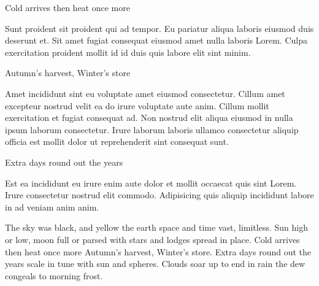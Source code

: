 {\mktsHTwo{}\cjkgGlue{} Cold arrives then heat once more\mktsHTwoBEG}%


\vspace{\myLineheight}\begin{multicols}{2}\raggedcolumns{}Sunt proident sit proident qui ad tempor. Eu pariatur aliqua laboris eiusmod duis deserunt et. Sit amet fugiat consequat eiusmod amet nulla laboris Lorem. Culpa exercitation proident mollit id id duis quis labore elit sint minim.



\end{multicols}


{\mktsHOne{}\cjkgGlue{} Autumn’s harvest, Winter’s store\mktsHOneBEG}%


\vspace{\myLineheight}\begin{multicols}{2}\raggedcolumns{}Amet incididunt sint eu voluptate amet eiusmod consectetur. Cillum amet excepteur nostrud velit ea do irure voluptate aute anim. Cillum mollit exercitation et fugiat consequat ad. Non nostrud elit aliqua eiusmod in nulla ipsum laborum consectetur. Irure laborum laboris ullamco consectetur aliquip officia est mollit dolor ut reprehenderit sint consequat sunt.



\end{multicols}


{\mktsHTwo{}\cjkgGlue{} Extra days round out the years\mktsHTwoBEG}%


\vspace{\myLineheight}\begin{multicols}{2}\raggedcolumns{}Est ea incididunt eu irure enim aute dolor et mollit occaecat quis sint Lorem. Irure consectetur nostrud elit commodo. Adipisicing quis aliquip incididunt labore in ad veniam anim anim.



\cjkgGlue{} The sky was black, and yellow the earth
\cjkgGlue{} space and time vast, limitless.
\cjkgGlue{} Sun high or low, moon full or parsed
\cjkgGlue{} with stars and lodges spread in place.
\cjkgGlue{} Cold arrives then heat once more
\cjkgGlue{} Autumn’s harvest, Winter’s store.
\cjkgGlue{} Extra days round out the years
\cjkgGlue{} scale in tune with sun and spheres.
\cjkgGlue{} Clouds soar up to end in rain
\cjkgGlue{} the dew congeals to morning frost.

\end{multicols}



